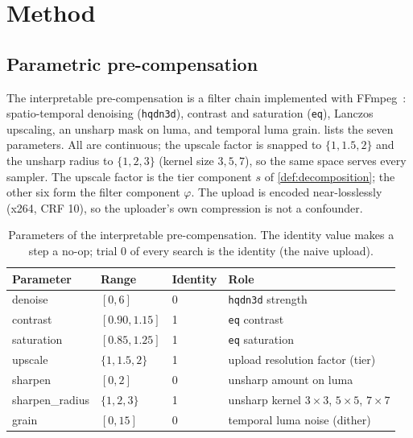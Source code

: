 \section{Method}
\label{sec:method}

\subsection{Parametric pre-compensation}
\label{sec:parametric}

The interpretable pre-compensation is a filter chain implemented with FFmpeg~\cite{ffmpeg}:
spatio-temporal denoising (\texttt{hqdn3d}), contrast and saturation (\texttt{eq}), Lanczos
upscaling, an unsharp mask on luma, and temporal luma grain.  lists the seven
parameters. All are continuous; the upscale factor is snapped to $\{1, 1.5, 2\}$ and the unsharp
radius to $\{1,2,3\}$ (kernel size $3,5,7$), so the same space serves every sampler. The upscale
factor is the tier component $s$ of \cref{def:decomposition}; the other six form the filter
component $\varphi$. The upload is encoded near-losslessly (x264, CRF 10), so the uploader's own
compression is not a confounder.

\begin{table}[t]
  \centering
  \caption{Parameters of the interpretable pre-compensation. The identity value makes a step a
  no-op; trial 0 of every search is the identity (the naive upload).}
  \label{tab:space}
  \begin{tabular}{@{}llll@{}}
    \toprule
    Parameter & Range & Identity & Role \\
    \midrule
    denoise        & $[0, 6]$       & 0   & \texttt{hqdn3d} strength \\
    contrast       & $[0.90, 1.15]$ & 1   & \texttt{eq} contrast \\
    saturation     & $[0.85, 1.25]$ & 1   & \texttt{eq} saturation \\
    upscale        & $\{1, 1.5, 2\}$ & 1  & upload resolution factor (tier) \\
    sharpen        & $[0, 2]$       & 0   & unsharp amount on luma \\
    sharpen\_radius & $\{1, 2, 3\}$ & 1   & unsharp kernel $3\times3$, $5\times5$, $7\times7$ \\
    grain          & $[0, 15]$      & 0   & temporal luma noise (dither) \\
    \bottomrule
  \end{tabular}
\end{table}

